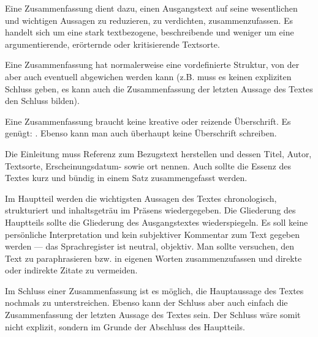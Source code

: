 



\thispagestyle{plain}



Eine Zusammenfassung dient dazu, einen Ausgangstext auf seine wesentlichen und wichtigen Aussagen zu reduzieren, zu verdichten, zusammenzufassen. Es handelt sich um eine stark textbezogene, beschreibende und weniger um eine argumentierende, er\"{o}rternde oder kritisierende Textsorte. 


Eine Zusammenfassung hat normalerweise eine vordefinierte Struktur, von der aber auch eventuell abgewichen werden kann (z.B. muss es keinen expliziten Schluss geben, es kann auch die Zusammenfassung der letzten Aussage des Textes den Schluss bilden).

\begin{itemize}


	Eine Zusammenfassung braucht keine kreative oder reizende \"{U}berschrift. Es gen\"{u}gt: . Ebenso kann man auch \"{u}berhaupt keine \"{U}berschrift schreiben.


	Die Einleitung muss Referenz zum Bezugstext herstellen und dessen Titel, Autor, Textsorte, Erscheinungsdatum- sowie ort nennen. Auch sollte die Essenz des Textes kurz und b\"{u}ndig in einem Satz zusammengefasst werden.


	Im Hauptteil werden die wichtigsten Aussagen des Textes chronologisch, strukturiert und inhaltsgetr\"{a}u im Pr\"{a}sens wiedergegeben. Die Gliederung des Hauptteils sollte die Gliederung des Ausgangstextes wiederspiegeln. Es soll keine pers\"{o}nliche Interpretation und kein subjektiver Kommentar zum Text gegeben werden --- das Sprachregister ist neutral, objektiv. Man sollte versuchen, den Text zu paraphrasieren bzw. in eigenen Worten zusammenzufassen und direkte oder indirekte Zitate zu vermeiden.


	Im Schluss einer Zusammenfassung ist es m\"{o}glich, die Hauptaussage des Textes nochmals zu unterstreichen. Ebenso kann der Schluss aber auch einfach die Zusammenfassung der letzten Aussage des Textes sein. Der Schluss w\"{a}re somit nicht explizit, sondern im Grunde der Abschluss des Hauptteils.

\end{itemize}


